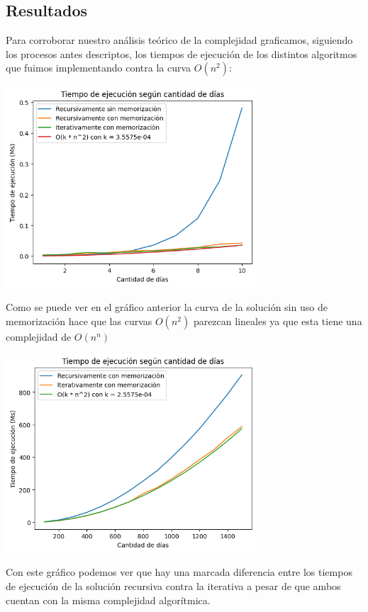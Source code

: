 \documentclass{estilo}
\begin{document}
\subsection{Resultados}

Para corroborar nuestro análisis teórico de la complejidad graficamos, siguiendo los procesos antes descriptos, los tiempos de ejecución de los distintos algoritmos que fuimos implementando contra la curva $O(n^2)$:

\begin{center}
\includegraphics[width=0.7\textwidth]{img/Results.png}
\end{center}
Como se puede ver en el gráfico anterior la curva de la solución sin uso de memorización  hace que las curvas $O(n^2)$ parezcan lineales ya que esta tiene una complejidad de $O(n^n)$
\begin{center}
\includegraphics[width=0.7\textwidth]{img/Results2.png}
\end{center}
Con este gráfico podemos ver que hay una marcada diferencia entre los tiempos de ejecución de la solución recursiva contra la iterativa a pesar de que ambos cuentan con la misma complejidad algorítmica.
\end{document}
